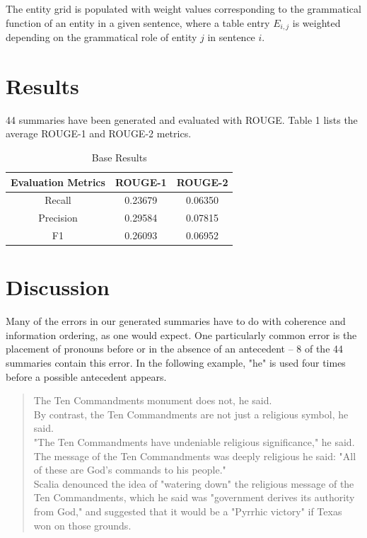\documentclass[11pt]{article}
\begin{document}
The entity grid is populated with weight values corresponding to the grammatical function of an entity in a given sentence, where a table entry $E_{i,j}$ is weighted depending on the grammatical role of entity $j$ in sentence $i$. 
\section{Results}

44 summaries have been generated and evaluated with ROUGE. Table 1 lists the average ROUGE-1 and ROUGE-2 metrics.

\begin{table}[ht]
\caption{Base Results} 
\centering
\begin{tabular}{c c c}
\hline
Evaluation Metrics & ROUGE-1 & ROUGE-2 \\
\hline
Recall          & 0.23679 & 0.06350 \\
\hline
Precision          & 0.29584 & 0.07815 \\
\hline
F1          & 0.26093 & 0.06952 \\
\hline
\end{tabular}
\end{table}

\section{Discussion}

Many of the errors in our generated summaries have to do with coherence and information ordering, as one would expect. One particularly common error is the placement of pronouns before or in the absence of an antecedent -- 8 of the 44 summaries contain this error. In the following example, "he" is used four times before a possible antecedent appears.\\

\begin{quote}
The Ten Commandments monument does not, he said.\\
By contrast, the Ten Commandments are not just a religious symbol, he said.\\
"The Ten Commandments have undeniable religious significance," he said.\\
The message of the Ten Commandments was deeply religious he said: "All of these are God's commands to his people."\\
Scalia denounced the idea of "watering down" the religious message of the Ten Commandments, which he said was "government derives its authority from God," and suggested that it would be a "Pyrrhic victory" if Texas won on those grounds.
\end{quote}
\end{document}

